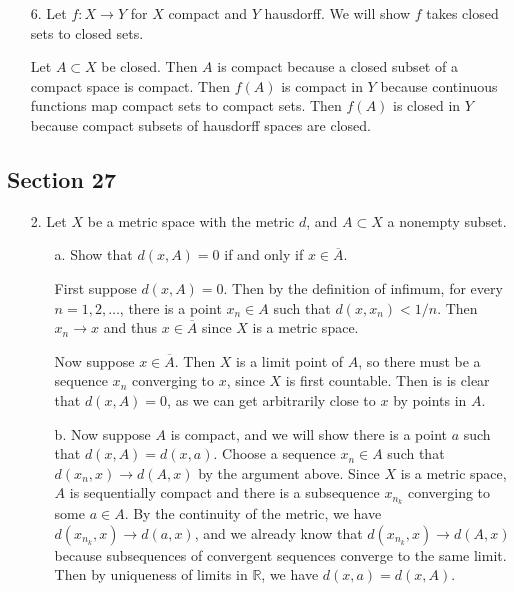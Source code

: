\documentclass[11pt, reqno]{article}
\theoremstyle{plain}
\theoremstyle{definition}
\theoremstyle{remark}
\newcommand{\RR}{\mathbb{R}}
\begin{document}
\begin{enumerate}
    \item[6.] Let $f: X \rightarrow Y$ for $X$ compact and $Y$ hausdorff. We will show $f$ takes closed sets to closed sets. 

    Let $A \subset X$ be closed. Then $A$ is compact because a closed subset of a compact space is compact. Then $f(A)$ 
    is compact in $Y$ because continuous functions map compact sets to compact sets. Then $f(A)$ is closed in $Y$ 
    because compact subsets of hausdorff spaces are closed. 
\end{enumerate}

\subsection*{Section 27}

\begin{enumerate}
    \item[2.] Let $X$ be a metric space with the metric $d$, and $A \subset X$ a nonempty subset. 
    \begin{enumerate}
        \item[a.] Show that $d(x, A) = 0$ if and only if $x \in \overline{A}$.
        
        First suppose $d(x, A) = 0$. Then by the definition of infimum, for every $n = 1, 2, \dots$, there is a 
        point $x_n \in A$ such that $d(x, x_n) < 1/n$. Then $x_n \rightarrow x$ and thus $x \in \overline{A}$ 
        since $X$ is a metric space. 

        Now suppose $x \in \overline{A}$. Then $X$ is a limit point of $A$, so there must be a sequence $x_n$ 
        converging to $x$, since $X$ is first countable. Then is is clear that $d(x, A) = 0$, as we can get 
        arbitrarily close to $x$ by points in $A$. 

        \item[b.] Now suppose $A$ is compact, and we will show there is a point $a$ such that $d(x, A) = d(x, a)$.
        Choose a sequence $x_n \in A$ such that $d(x_n, x) \rightarrow d(A, x)$ by the argument above. Since 
        $X$ is a metric space, $A$ is sequentially compact and there is a subsequence $x_{n_k}$ converging 
        to some $a \in A$. By the continuity of the metric, we have $d(x_{n_k}, x) \rightarrow d(a, x)$, 
        and we already know that $d(x_{n_k}, x) \rightarrow d(A, x)$ because subsequences of convergent 
        sequences converge to the same limit. Then by uniqueness of limits in $\RR$, we have $d(x, a) = d(x, A)$.


\end{enumerate}
\end{enumerate}
\end{document}
